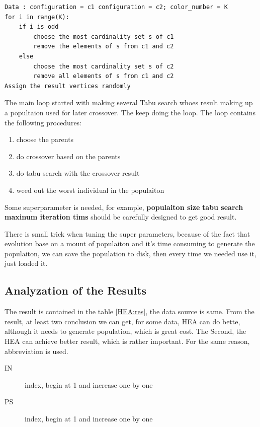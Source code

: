 \documentclass[10pt, a4paper, twocolumn]{article} %
\begin{document}
\begin{lstlisting}
Data : configuration = c1 configuration = c2; color_number = K
for i in range(K):
    if i is odd
        choose the most cardinality set s of c1
        remove the elements of s from c1 and c2
    else
        choose the most cardinality set s of c2
        remove all elements of s from c1 and c2
Assign the result vertices randomly
\end{lstlisting}

The main loop started with making several Tabu search whoes result making up a
popultaion used for later crossover. The keep doing the loop. The loop contains
the following procedures:
\begin{enumerate}
    \item choose the parents
    \item do crossover based on the parents
    \item do tabu search with the crossover result
    \item weed out the worst individual in the populaiton
\end{enumerate}
Some superparameter is needed, for example, \textbf{populaiton size}
\textbf{tabu search maxinum iteration tims} should be carefully designed to get
good result.

There is small trick when tuning the super parameters, because of the fact that
evolution base on a mount of populaiton and it's time consuming to generate the
populaiton, we can save the population to disk, then every time we needed use
it, just loaded it.


\subsection{Analyzation of the Results}

The result is contained in the table  \ref{HEA:res}, the data source
\citep{Reference1}is same. From the result, at least two conclusion we can
get, for some data, HEA can do bette, although it needs to generate population,
which is great cost. The Second, the HEA can achieve better result, which is
rather important.
For the same reason, abbreviation is used.
\begin{description}
	\item[IN] index, begin at 1 and increase one by one
	\item[PS] index, begin at 1 and increase one by one
\end{description}
\end{document}
